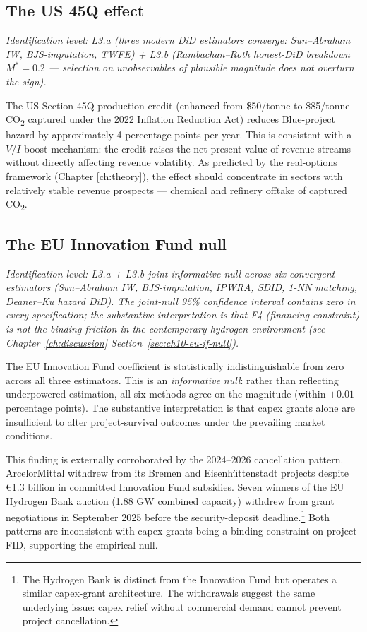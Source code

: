 \subsection{The US 45Q effect}
\noindent\emph{Identification level: L3.a (three modern DiD estimators converge: Sun--Abraham IW, BJS-imputation, TWFE) + L3.b (Rambachan--Roth honest-DiD breakdown $M^{*} = 0.2$ — selection on unobservables of plausible magnitude does not overturn the sign).}


The US Section 45Q production credit (enhanced from \$50/tonne to \$85/tonne CO\textsubscript{2} captured under the 2022 Inflation Reduction Act) reduces Blue-project hazard by approximately 4 percentage points per year. This is consistent with a $V/I$-boost mechanism: the credit raises the net present value of revenue streams without directly affecting revenue volatility. As predicted by the real-options framework (Chapter \ref{ch:theory}), the effect should concentrate in sectors with relatively stable revenue prospects --- chemical and refinery offtake of captured CO\textsubscript{2}.

\subsection{The EU Innovation Fund null}
\noindent\emph{Identification level: L3.a + L3.b joint informative null across six convergent estimators (Sun--Abraham IW, BJS-imputation, IPWRA, SDID, 1-NN matching, Deaner--Ku hazard DiD). The joint-null 95\% confidence interval contains zero in every specification; the substantive interpretation is that F4 (financing constraint) is not the binding friction in the contemporary hydrogen environment (see Chapter~\ref{ch:discussion} Section~\ref{sec:ch10-eu-if-null}).}


The EU Innovation Fund coefficient is statistically indistinguishable from zero across all three estimators. This is an \emph{informative null}: rather than reflecting underpowered estimation, all six methods agree on the magnitude (within $\pm 0.01$ percentage points). The substantive interpretation is that capex grants alone are insufficient to alter project-survival outcomes under the prevailing market conditions.

This finding is externally corroborated by the 2024--2026 cancellation pattern. ArcelorMittal withdrew from its Bremen and Eisenhüttenstadt projects despite \euro 1.3 billion in committed Innovation Fund subsidies. Seven winners of the EU Hydrogen Bank auction (1.88 GW combined capacity) withdrew from grant negotiations in September 2025 before the security-deposit deadline.\footnote{The Hydrogen Bank is distinct from the Innovation Fund but operates a similar capex-grant architecture. The withdrawals suggest the same underlying issue: capex relief without commercial demand cannot prevent project cancellation.} Both patterns are inconsistent with capex grants being a binding constraint on project FID, supporting the empirical null.

